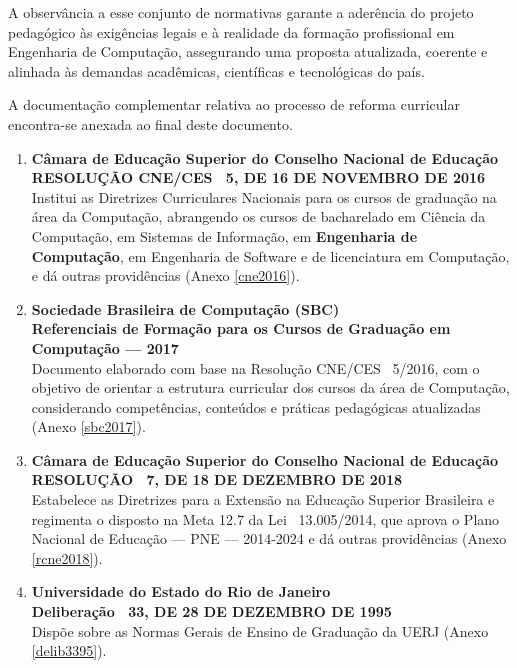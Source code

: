 A observância a esse conjunto de normativas garante a aderência do projeto pedagógico às exigências legais e à realidade da formação profissional em Engenharia de Computação, assegurando uma proposta atualizada, coerente e alinhada às demandas acadêmicas, científicas e tecnológicas do país.

A documentação complementar relativa ao processo de reforma curricular encontra-se anexada ao final deste documento.

\begin{enumerate}
      \item \textbf{Câmara de Educação Superior do Conselho Nacional de Educação}  \\
            \textbf{RESOLUÇÃO CNE/CES ~5, DE 16 DE NOVEMBRO DE 2016}  \\
            Institui as Diretrizes Curriculares Nacionais para os cursos de graduação na área da Computação, abrangendo os cursos de bacharelado em Ciência da Computação, em Sistemas de Informação, em \textbf{Engenharia de Computação}, em Engenharia de Software e de licenciatura em Computação, e dá outras providências (Anexo \ref{cne2016}).

      \item \textbf{Sociedade Brasileira de Computação (SBC)}  \\
            \textbf{Referenciais de Formação para os Cursos de Graduação em Computação –-- 2017} \\
            Documento elaborado com base na Resolução CNE/CES ~5/2016, com o objetivo de orientar a estrutura curricular dos cursos da área de Computação, considerando competências, conteúdos e práticas pedagógicas atualizadas (Anexo \ref{sbc2017}).

      \item \textbf{Câmara de Educação Superior do Conselho Nacional de Educação}  \\
            \textbf{RESOLUÇÃO ~7, DE 18 DE DEZEMBRO DE 2018}  \\
            Estabelece as Diretrizes para a Extensão na Educação Superior Brasileira e regimenta o disposto na Meta 12.7 da Lei ~13.005/2014, que aprova o Plano Nacional de Educação –-- PNE –-- 2014-2024 e dá outras providências (Anexo \ref{rcne2018}).

      \item \textbf{Universidade do Estado do Rio de Janeiro}  \\
            \textbf{Deliberação ~33, DE 28 DE DEZEMBRO DE 1995}  \\
            Dispõe sobre as Normas Gerais de Ensino de Graduação da UERJ (Anexo \ref{delib3395}).


\end{enumerate}
